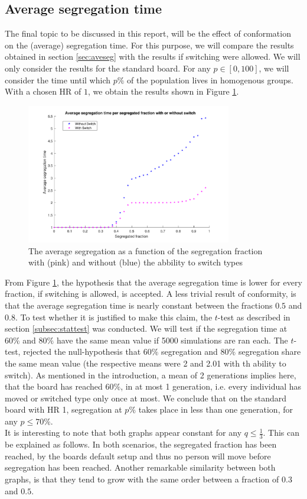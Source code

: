 \subsection{Average segregation time}
The final topic to be discussed in this report, will be the effect of conformation on the (average) segregation time. 
For this purpose, we will compare the results obtained in section \ref{sec:aveseg} with the results if switching were allowed. 
We will only consider the results for the standard board.
For any \(p\in [0,100]\), we will consider the time until which \(p\%\) of the population lives in homogenous groups. With a chosen HR of $1$, we obtain the results shown in Figure \ref{fig:avesegsw}.

\begin{figure}[H]
    \centering
    \includegraphics[width=0.8\textwidth]{Avesegsw2}
    \caption{The average segregation as a function of the segregation fraction with (pink) and without (blue) the abbility to switch types}
    \label{fig:avesegsw}
\end{figure}

From Figure \ref{fig:avesegsw}, the hypothesis that the average segregation time is lower for every fraction, if switching is allowed, is accepted. 
A less trivial result of conformity, is that the average segregation time is nearly constant between the fractions \(0.5\) and \(0.8\). 
To test whether it is justified to make this claim,  the \(t\)-test as described in section \ref{subsec:stattest} was conducted. We will test if the segregation time at \(60\%\) and \(80\%\) have the same mean value if 5000 simulations are ran each. 
The \(t\)-test, rejected the null-hypothesis that \(60\%\) segregation and \(80\%\) segregation share the same mean value (the respective means were 2 and 2.01 with th ability to switch). As mentioned in the introduction, a mean of 2 generations implies here, that the board has reached \(60\%\), in at most 1 generation, i.e. every individual has moved or switched type only once at most.
We conclude that on the standard board with HR 1, segregation at \(p\%\) takes place in less than one generation, for any \(p\leq 70\%\).\\
 
It is interesting to note that both graphs appear constant for any \(q\leq \frac{1}{3}\). 
This can be explained as follows. In both scenarios, the segregated fraction has been reached, by the boards default setup and thus no person will move before segregation has been reached.
Another remarkable similarity between both graphs, is that they tend to grow with the same order between a fraction of $0.3$ and $0.5$.
